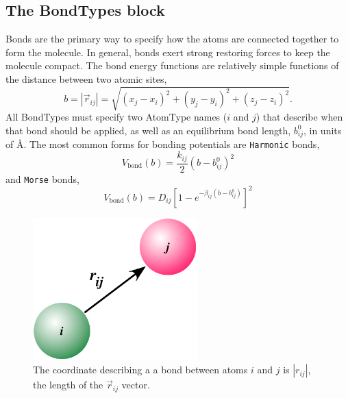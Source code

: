 \documentclass[]{book}
\begin{document}
\subsection{\label{section:ffBond}The BondTypes block}

Bonds are the primary way to specify how the atoms are connected
together to form the molecule.  In general, bonds exert strong
restoring forces to keep the molecule compact.  The bond energy
functions are relatively simple functions of the distance between two
atomic sites,
\begin{equation}
b = \left| \vec{r}_{ij} \right| = \sqrt{(x_j - x_i)^2 + (y_j - y_i)^2
  + (z_j - z_i)^2}.
\end{equation} 
All BondTypes must specify two AtomType names ($i$ and $j$) that
describe when that bond should be applied, as well as an equilibrium
bond length, $b_{ij}^0$, in units of \AA. The most common forms for
bonding potentials are {\tt Harmonic} bonds,
\begin{equation}
V_{\text{bond}}(b) = \frac{k_{ij}}{2} \left(b - 
  b_{ij}^0 \right)^2
\end{equation}
and {\tt Morse} bonds,
\begin{equation}
V_{\text{bond}}(b) = D_{ij} \left[ 1 - e^{-\beta_{ij} (b - b_{ij}^0)} \right]^2
\end{equation}

\begin{figure}[h]
\centering
\includegraphics[width=2.5in]{bond.pdf}
\caption[Bond coordinates]{The coordinate describing a
a bond between atoms $i$ and $j$ is $|r_{ij}|$, the length of the
$\vec{r}_{ij}$ vector. } 
\label{fig:bond}
\end{figure}
\end{document}
